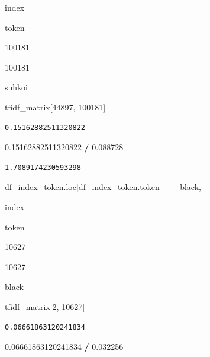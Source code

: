 \documentclass[
  11pt,
  a4paper,
]{article}
\newenvironment{Shaded}{\begin{snugshade}}{\end{snugshade}}
\newcommand{\DecValTok}[1]{\textcolor[rgb]{0.00,0.00,0.81}{#1}}
\newcommand{\FloatTok}[1]{\textcolor[rgb]{0.00,0.00,0.81}{#1}}
\newcommand{\NormalTok}[1]{#1}
\newcommand{\OperatorTok}[1]{\textcolor[rgb]{0.81,0.36,0.00}{\textbf{#1}}}
\newcommand{\StringTok}[1]{\textcolor[rgb]{0.31,0.60,0.02}{#1}}
\begin{document}
index

token

100181

100181

suhkoi

\begin{Shaded}
\begin{Highlighting}[]
\NormalTok{tfidf\_matrix[}\DecValTok{44897}\NormalTok{, }\DecValTok{100181}\NormalTok{]}
\end{Highlighting}
\end{Shaded}

\begin{verbatim}
0.15162882511320822
\end{verbatim}

\begin{Shaded}
\begin{Highlighting}[]
\FloatTok{0.15162882511320822} \OperatorTok{/} \FloatTok{0.088728}
\end{Highlighting}
\end{Shaded}

\begin{verbatim}
1.7089174230593298
\end{verbatim}

\begin{Shaded}
\begin{Highlighting}[]
\NormalTok{df\_index\_token.loc[df\_index\_token.token }\OperatorTok{==} \StringTok{\textquotesingle{}black\textquotesingle{}}\NormalTok{, ]}
\end{Highlighting}
\end{Shaded}

index

token

10627

10627

black

\begin{Shaded}
\begin{Highlighting}[]
\NormalTok{tfidf\_matrix[}\DecValTok{2}\NormalTok{, }\DecValTok{10627}\NormalTok{]}
\end{Highlighting}
\end{Shaded}

\begin{verbatim}
0.06661863120241834
\end{verbatim}

\begin{Shaded}
\begin{Highlighting}[]
\FloatTok{0.06661863120241834} \OperatorTok{/} \FloatTok{0.032256}
\end{Highlighting}
\end{Shaded}
\end{document}
